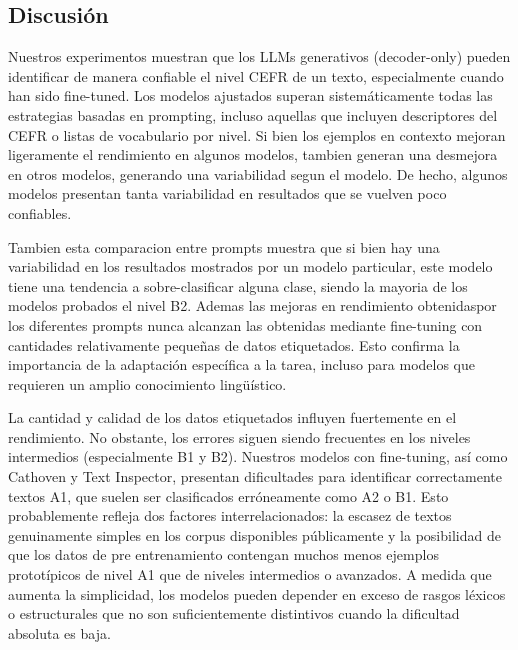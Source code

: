
\subsection{Discusión}\label{subsection:clas_discucion}

Nuestros experimentos muestran que los LLMs generativos (decoder-only) pueden identificar de manera confiable el nivel CEFR de un texto, especialmente cuando han sido fine-tuned. Los modelos ajustados superan sistemáticamente todas las estrategias basadas en prompting, incluso aquellas que incluyen descriptores del CEFR o listas de vocabulario por nivel. Si bien los ejemplos en contexto mejoran ligeramente el rendimiento en algunos modelos, tambien generan una desmejora en otros modelos, generando una variabilidad segun el modelo. De hecho, algunos modelos presentan tanta variabilidad en resultados que se vuelven poco confiables.

Tambien esta comparacion entre prompts muestra que si bien hay una variabilidad en los resultados mostrados por un modelo particular, este modelo tiene una tendencia a sobre-clasificar alguna clase, siendo la mayoria de los modelos probados el nivel B2.
Ademas las mejoras en rendimiento obtenidaspor los diferentes prompts nunca alcanzan las obtenidas mediante fine-tuning con cantidades relativamente pequeñas de datos etiquetados. Esto confirma la importancia de la adaptación específica a la tarea, incluso para modelos que requieren un amplio conocimiento lingüístico.

La cantidad y calidad de los datos etiquetados influyen fuertemente en el rendimiento. No obstante, los errores siguen siendo frecuentes en los niveles intermedios (especialmente B1 y B2). Nuestros modelos con fine-tuning, así como Cathoven y Text Inspector, presentan dificultades para identificar correctamente textos A1, que suelen ser clasificados erróneamente como A2 o B1. Esto probablemente refleja dos factores interrelacionados: la escasez de textos genuinamente simples en los corpus disponibles públicamente y la posibilidad de que los datos de pre entrenamiento contengan muchos menos ejemplos prototípicos de nivel A1 que de niveles intermedios o avanzados. A medida que aumenta la simplicidad, los modelos pueden depender en exceso de rasgos léxicos o estructurales que no son suficientemente distintivos cuando la dificultad absoluta es baja.

